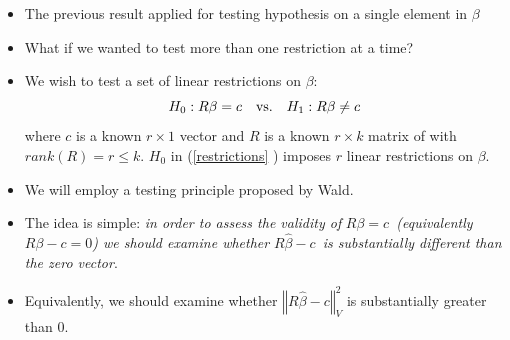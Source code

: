 \documentclass[notes=show]{beamer}
\begin{document}
\begin{frame}%


\begin{itemize}
\item The previous result applied for testing hypothesis on a single element
in $\beta $

\item What if we wanted to test more than one restriction at a time?

\item We wish to test a set of linear restrictions on $\beta $:%
\begin{equation}
H_{0}:R\beta =c\quad \text{vs.\quad }H_{1}:R\beta \neq c
\label{restrictions}
\end{equation}%
where $c$ is a known $r\times 1$ vector and $R$ is a known $r\times k$
matrix of with $rank\left( R\right) =r\leq k$. $H_{0}$ in (\ref{restrictions}%
) imposes $r$ linear restrictions on $\beta $.

\item We will employ a testing principle proposed by Wald.

\item The idea is simple: \textit{in order to assess the validity of }$%
R\beta =c$\textit{\ (equivalently }$R\beta -c=0$\textit{) we should examine
whether }$R\hat{\beta}-c$\textit{\ is substantially different than the zero
vector}.

\item Equivalently, we should examine whether $\left\Vert R\hat{\beta}%
-c\right\Vert _{V}^{2}$ is substantially greater than 0.
\end{itemize}

\end{frame}%
\end{document}
